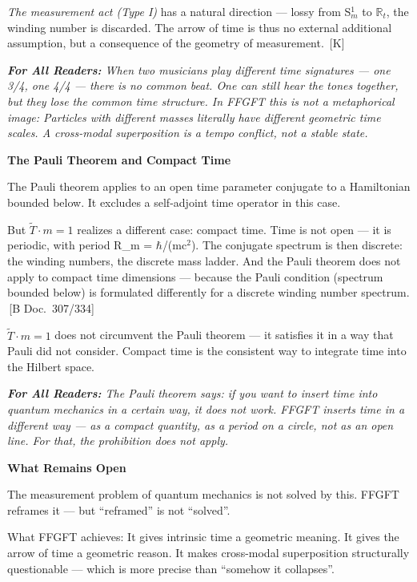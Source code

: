 \documentclass[11pt,oneside]{book}
\newcommand{\status}[1]{\penalty10000\,{\scriptsize\textcolor{gray!60}{[#1]}}}
\newenvironment{laierspur}{%
  \par\vspace{4pt}%
  \noindent\small\itshape\color{blue!60!black}%
  \textbf{For All Readers:}\enspace\ignorespaces}{%
  \par\vspace{4pt}\normalsize\normalfont\normalcolor}
\begin{document}
\textit{The measurement act (Type I)} has a natural direction — lossy
from S$^1_m$ to $\mathbb{R}_t$, the winding number is discarded. The arrow of time
is thus no external additional assumption, but a consequence of the geometry
of measurement. \status{K}

\begin{laierspur}
When two musicians play different time signatures — one 3/4, one 4/4 —
there is no common beat. One can still hear the tones together, but they
lose the common time structure. In FFGFT this is not a metaphorical image:
Particles with different masses literally have different geometric time
scales. A cross-modal superposition is a tempo conflict, not a stable state.
\end{laierspur}

\textbf{The Pauli Theorem and Compact Time}

The Pauli theorem applies to an open time parameter conjugate to a
Hamiltonian bounded below. It excludes a self-adjoint time operator in this
case.

But $\tilde{T}\cdot m=1$ realizes a different case: compact time. Time is not
open — it is periodic, with period R\_m = $\hbar$/(mc$^2$). The conjugate
spectrum is then discrete: the winding numbers, the discrete mass ladder.
And the Pauli theorem does not apply to compact time dimensions — because
the Pauli condition (spectrum bounded below) is formulated differently for a
discrete winding number spectrum. \status{B Doc.~307/334}

$\tilde{T}\cdot m=1$ does not circumvent the Pauli theorem — it satisfies it
in a way that Pauli did not consider. Compact time is the consistent way to
integrate time into the Hilbert space.

\begin{laierspur}
The Pauli theorem says: if you want to insert time into quantum mechanics
in a certain way, it does not work. FFGFT inserts time in a different way —
as a compact quantity, as a period on a circle, not as an open line. For
that, the prohibition does not apply.
\end{laierspur}

\textbf{What Remains Open}

The measurement problem of quantum mechanics is not solved by this. FFGFT
reframes it — but \enquote{reframed} is not \enquote{solved}.

What FFGFT achieves: It gives intrinsic time a geometric meaning. It gives
the arrow of time a geometric reason. It makes cross-modal superposition
structurally questionable — which is more precise than \enquote{somehow it collapses}.
\end{document}
